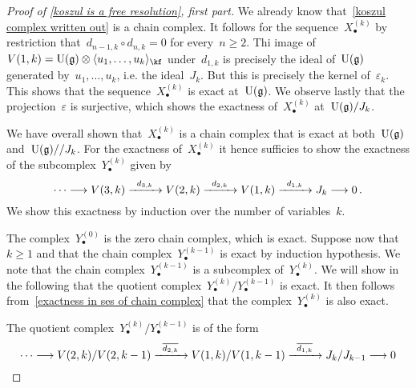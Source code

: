 \begin{proof}[Proof of \cref{koszul is a free resolution}, first part]
	We already know that~\eqref{koszul complex written out} is a chain complex.
	It follows for the sequence~$X^{(k)}_\bullet$ by restriction that~$d_{n-1,k} \circ d_{n,k} = 0$ for every~$n \geq 2$.
	Thi image of~$V(1,k) = \Univ(\glie) \otimes \gen{u_1, \dotsc, u_k}_{\kf}$ under~$d_{1,k}$ is precisely the ideal of~$\operatorname{U}(\mathfrak{g})$ generated by~$u_1, \dotsc, u_k$, i.e. the ideal~$J_k$.
	But this is precisely the kernel of~$\varepsilon_k$.
	This shows that the sequence~$X^{(k)}_\bullet$ is exact at~$\operatorname{U}(\mathfrak{g})$.
	We observe lastly that the projection~$\varepsilon$ is surjective, which shows the exactness of~$X^{(k)}_\bullet$ at~$\operatorname{U}(\mathfrak{g}) / J_k$.

	We have overall shown that~$X^{(k)}_\bullet$ is a chain complex that is exact at both~$\operatorname{U}(\mathfrak{g})$ and~$\operatorname{U}(\mathfrak{g})/ / J_k$.
	For the exactness of~$X^{(k)}_\bullet$ it hence sufficies to show the exactness of the subcomplex~$Y^{(k)}_\bullet$ given by
	\[
		\dotsb
		\to
		V(3,k)
		\xto{d_{3,k}}
		V(2,k)
		\xto{d_{2,k}}
		V(1,k)
		\xto{d_{1,k}}
		J_k
		\to
		0 \,.
	\]
	We show this exactness by induction over the number of variables~$k$.

	The complex~$Y^{(0)}_\bullet$ is the zero chain complex, which is exact.
	Suppose now that~$k \geq 1$ and that the chain complex~$Y^{(k-1)}_\bullet$ is exact by induction hypothesis.
	We note that the chain complex~$Y^{(k-1)}_\bullet$ is a subcomplex of~$Y^{(k)}_\bullet$.
	We will show in the following that the quotient complex~$Y^{(k)}_\bullet / Y^{(k-1)}_\bullet$ is exact.
	It then follows from~\cref{exactness in ses of chain complex} that the complex~$Y^{(k)}_\bullet$ is also exact.

	The quotient complex~$Y^{(k)}_\bullet / Y^{(k-1)}_\bullet$ is of the form
	\[
		\dotsb
		\to
		V(2,k) / V(2, k-1)
		\xto{\induced{d_{2,k}}}
		V(1,k) / V(1, k-1)
		\xto{\induced{d_{1,k}}}
		J_k / J_{k-1}
		\to
		0
	\]


\end{proof}
